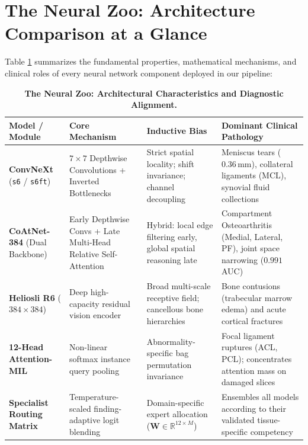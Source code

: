 \documentclass[11pt,a4paper]{article}
\begin{document}
\section{The Neural Zoo: Architecture Comparison at a Glance}

Table \ref{tab:zoo} summarizes the fundamental properties, mathematical mechanisms, and clinical roles of every neural network component deployed in our pipeline:

\begin{table}[h!]
\centering
\small
\renewcommand{\arraystretch}{1.3}
\begin{tabularx}{\textwidth}{p{2.6cm} p{2.8cm} p{3.4cm} X}
\toprule
\textbf{Model / Module} & \textbf{Core Mechanism} & \textbf{Inductive Bias} & \textbf{Dominant Clinical Pathology} \\
\midrule
\textbf{ConvNeXt} \newline (\texttt{s6} / \texttt{s6ft}) & $7\times 7$ Depthwise Convolutions + Inverted Bottlenecks & Strict spatial locality; shift invariance; channel decoupling & Meniscus tears ($0.36\,\text{mm}$), collateral ligaments (MCL), synovial fluid collections \\
\midrule
\textbf{CoAtNet-384} \newline (Dual Backbone) & Early Depthwise Convs + Late Multi-Head Relative Self-Attention & Hybrid: local edge filtering early, global spatial reasoning late & Compartment Osteoarthritis (Medial, Lateral, PF), joint space narrowing ($0.991$ AUC) \\
\midrule
\textbf{Heliosli R6} \newline ($384\times 384$) & Deep high-capacity residual vision encoder & Broad multi-scale receptive field; cancellous bone hierarchies & Bone contusions (trabecular marrow edema) and acute cortical fractures \\
\midrule
\textbf{12-Head Attention-MIL} & Non-linear softmax instance query pooling & Abnormality-specific bag permutation invariance & Focal ligament ruptures (ACL, PCL); concentrates attention mass on damaged slices \\
\midrule
\textbf{Specialist Routing Matrix} & Temperature-scaled finding-adaptive logit blending & Domain-specific expert allocation ($\mathbf{W} \in \mathbb{R}^{12 \times M}$) & Ensembles all models according to their validated tissue-specific competency \\
\bottomrule
\end{tabularx}
\caption{\textbf{The Neural Zoo: Architectural Characteristics and Diagnostic Alignment.}}
\label{tab:zoo}
\end{table}
\end{document}
